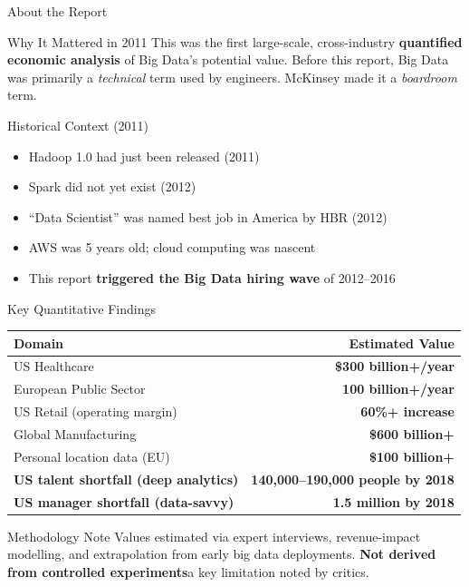\documentclass[aspectratio=169,10pt]{beamer}
\begin{document}
\begin{frame}{About the Report}
   
      \begin{alertblock}{Why It Mattered in 2011}
        This was the first large-scale, cross-industry \textbf{quantified economic analysis} of Big Data's potential value.  Before this report, Big Data was primarily a \emph{technical} term used by engineers.  McKinsey made it a \emph{boardroom} term.
      \end{alertblock}
      \vspace{6pt}
      \begin{exampleblock}{Historical Context (2011)}
        \begin{itemize}
          \small
          \item Hadoop 1.0 had just been released (2011)
          \item Spark did not yet exist (2012)
          \item ``Data Scientist'' was named best job in America by HBR (2012)
          \item AWS was 5 years old; cloud computing was nascent
          \item This report \textbf{triggered the Big Data hiring wave} of 2012--2016
        \end{itemize}
      \end{exampleblock}
 
\end{frame}
\begin{frame}{Key Quantitative Findings} 
      \centering
      \renewcommand{\arraystretch}{1.5}
      \begin{tabular}{lr}
        \toprule
        \textbf{Domain} & \textbf{Estimated Value} \\
        \midrule
        US Healthcare & \alert{\textbf{\$300 billion+/year}} \\
        European Public Sector & \textbf{\texteuro{}100 billion+/year} \\
        US Retail (operating margin) & \textbf{60\%+ increase} \\
        Global Manufacturing & \textbf{\$600 billion+} \\
        Personal location data (EU) & \textbf{\$100 billion+} \\
        \midrule
        \textbf{US talent shortfall (deep analytics)} & \textbf{140{,}000--190{,}000 people by 2018} \\
        \textbf{US manager shortfall (data-savvy)} & \textbf{1.5 million by 2018} \\
        \bottomrule
      \end{tabular}
      \vspace{8pt}
      \begin{block}{Methodology Note}
        Values estimated via expert interviews, revenue-impact modelling, and extrapolation from early big data deployments.  \textbf{Not derived from controlled experiments}\textemdash a key limitation noted by critics.
      \end{block}
 
\end{frame}
\end{document}
